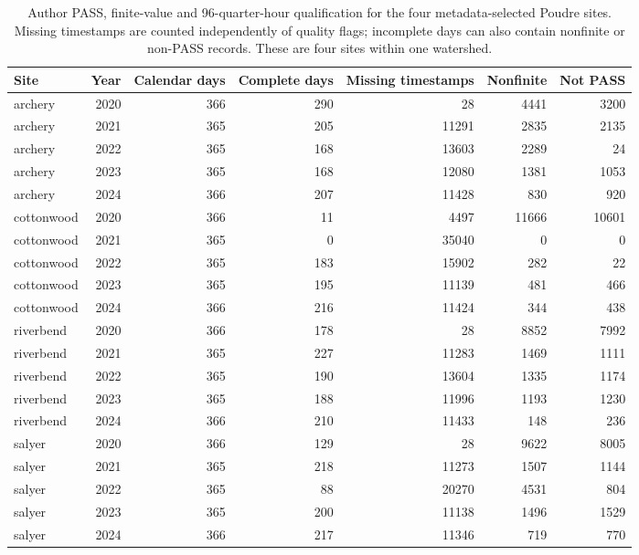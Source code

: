 \begin{table}[p]\centering\scriptsize
\caption{Author PASS, finite-value and 96-quarter-hour qualification for the four metadata-selected Poudre sites. Missing timestamps are counted independently of quality flags; incomplete days can also contain nonfinite or non-PASS records. These are four sites within one watershed.}\label{tab:poudre-reference}
\begin{tabular}{lrrrrrr}\toprule
Site & Year & Calendar days & Complete days & Missing timestamps & Nonfinite & Not PASS\\\midrule
archery & 2020 & 366 & 290 & 28 & 4441 & 3200\\
archery & 2021 & 365 & 205 & 11291 & 2835 & 2135\\
archery & 2022 & 365 & 168 & 13603 & 2289 & 24\\
archery & 2023 & 365 & 168 & 12080 & 1381 & 1053\\
archery & 2024 & 366 & 207 & 11428 & 830 & 920\\
cottonwood & 2020 & 366 & 11 & 4497 & 11666 & 10601\\
cottonwood & 2021 & 365 & 0 & 35040 & 0 & 0\\
cottonwood & 2022 & 365 & 183 & 15902 & 282 & 22\\
cottonwood & 2023 & 365 & 195 & 11139 & 481 & 466\\
cottonwood & 2024 & 366 & 216 & 11424 & 344 & 438\\
riverbend & 2020 & 366 & 178 & 28 & 8852 & 7992\\
riverbend & 2021 & 365 & 227 & 11283 & 1469 & 1111\\
riverbend & 2022 & 365 & 190 & 13604 & 1335 & 1174\\
riverbend & 2023 & 365 & 188 & 11996 & 1193 & 1230\\
riverbend & 2024 & 366 & 210 & 11433 & 148 & 236\\
salyer & 2020 & 366 & 129 & 28 & 9622 & 8005\\
salyer & 2021 & 365 & 218 & 11273 & 1507 & 1144\\
salyer & 2022 & 365 & 88 & 20270 & 4531 & 804\\
salyer & 2023 & 365 & 200 & 11138 & 1496 & 1529\\
salyer & 2024 & 366 & 217 & 11346 & 719 & 770\\
\bottomrule\end{tabular}
\end{table}
